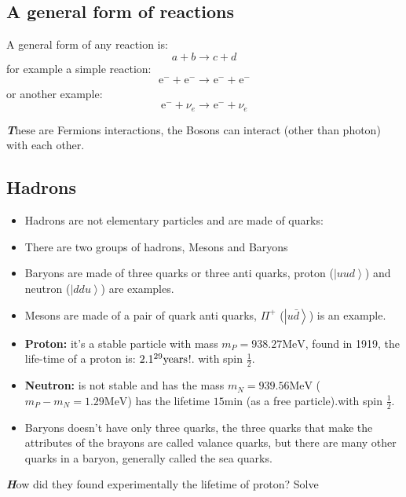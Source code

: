\documentclass[10pt,a4paper]{article}
\newenvironment{callout}
	{\begin{calloutbox}\color{charcoal}\textbf\textit}
	{\end{calloutbox}}
\newcommand{\mev}{\text{MeV}}
\newcommand{\ch}[5]{{}^{#2}_{#3}\!\text{#1}^{#4}_{#5}}
\newcommand{\electron}{\ch{e}{}{}{-}{}}
\newcommand{\ket}[1]{\left\vert #1 \right\rangle}
\begin{document}
          \subsection{A general form of reactions}
          A general form of any reaction is:
          \begin{equation}
               a + b \rightarrow c+d
          \end{equation}
          for example a simple reaction:
          \begin{equation}
               \electron +\electron\rightarrow\electron +\electron
          \end{equation}
          or another example:
          \begin{equation}
               \electron +\nu_e \rightarrow\electron+\nu_e
          \end{equation}
          \begin{callout}
               These are Fermions interactions, the Bosons can interact (other than photon) with each other.
          \end{callout}
     \subsection{Hadrons}
     \begin{itemize}
          \item Hadrons are not elementary particles and are made of quarks:
          \item There are two groups of hadrons, Mesons and Baryons
          \item Baryons are made of three quarks or three anti quarks, proton ($\ket{uud}$) and neutron ($\ket{ddu}$) are examples.
          \item Mesons are made of a pair of quark anti quarks, $\Pi^+$ ($\ket{u\bar d}$) is an example.
          \item \textbf{Proton:} it's a stable particle with mass $m_P = 938.27\mev$, found in 1919, the life-time of a proton is: $2.1 \time 10^{29} \text{years}$!. with spin $\frac12$.
          \item \textbf{Neutron:} is not stable and has the mass $m_N = 939.56\mev$ ($m_P-m_N = 1.29\mev$) has the lifetime $15\text{min}$ (as a free particle).with spin $\frac12$.
          \item Baryons doesn't have only three quarks, the three quarks that make the attributes of the brayons are called valance quarks, but there are many other quarks in a baryon, generally called the sea quarks.
     \end{itemize}
     \begin{callout}
          How did they found experimentally the lifetime of proton? Solve
     \end{callout}
\end{document}
